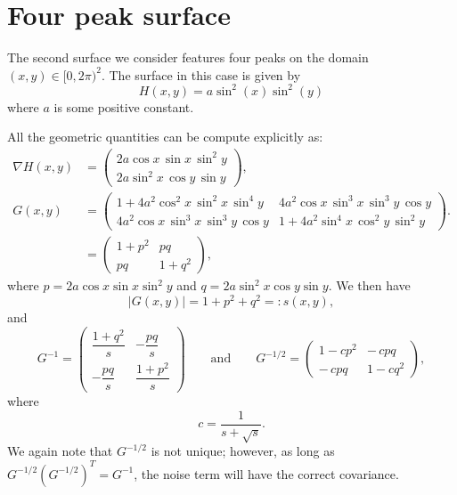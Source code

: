 \documentclass[11pt, a4paper]{article}
\begin{document}
\section{Four peak surface}\label{AppendixB}

The second surface we consider features four peaks on the domain
$(x,y) \in [0,2\pi)^2 $.  The surface in this case is given by
\[
H(x,y) = a \sin^2(x) \sin^2(y)
\]
where $a$ is some positive constant.

All the geometric quantities can be compute explicitly as:
\begin{align*}
    \nabla H(x,y) &= \begin{pmatrix}
        2 a \cos x \, \sin x \,\sin^2 y  \\ 2a \sin^2 x \,\cos y \,\sin y
    \end{pmatrix}, \\
    G(x,y)
     &= \begin{pmatrix}
   1 + 4 a^2 \cos^2 x \,\sin^2 x \,\sin^4 y & 4 a^2 \cos x\, \sin^3 x\, \sin^3 y \,\cos y\\[1ex]
   4 a^2 \cos x \,\sin^3 x \,\sin^3 y\, \cos y  & 1 + 4 a^2 \sin^4 x \,\cos^2y \,\sin^2y
   \end{pmatrix}.\\
    &= \begin{pmatrix}
   1+p^2 & pq \\[1ex]
   pq & 1+q^2
   \end{pmatrix},
   \end{align*}
where $p =  2 a \cos x  \sin x \sin^2 y$ and $q = 2a \sin^2 x \cos y \sin y$.
We then have
\[
|G(x,y)| = 1+p^2+q^2 =: s(x,y),
\]
and
\[
G^{-1} = 
\begin{pmatrix}
  \dfrac{1+q^2}{s} & -\dfrac{pq}{s}\\[2ex]
   -\dfrac{pq}{s} & \dfrac{1+p^2}{s}
   \end{pmatrix}
   \qquad \mathrm{and} \qquad G^{-1/2} = \begin{pmatrix}
   1-c p^2 & -\,c pq\\[4pt]
-\,c pq & 1-c q^2
   \end{pmatrix},
\]
where 
\[
c = \frac{1}{s + \sqrt{s}}.
\]
We again note that $G^{-1/2}$ is not unique; however, as long as $G^{-1/2}(G^{-1/2})^T = G^{-1}$, the noise term will have the correct covariance.
\end{document}
